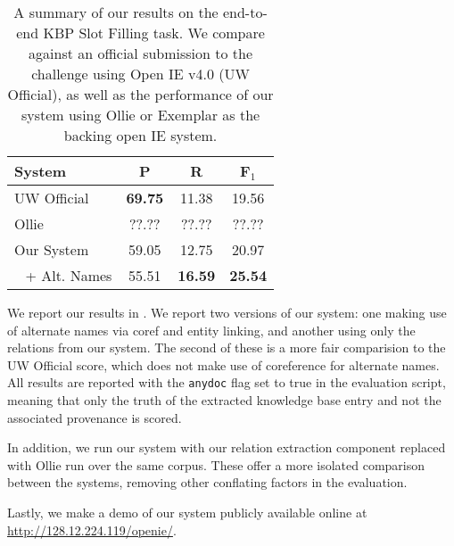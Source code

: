 \begin{table}
\begin{center}
\begin{tabular}{l|cc:c}
\textbf{System} & \textbf{P} & \textbf{R} & \textbf{F$_1$} \\
\hline
UW Official         & \textbf{69.75} & 11.38 & 19.56 \\
Ollie               & ??.?? & ??.?? & ??.?? \\
\hline
Our System          & 59.05 & 12.75 & 20.97 \\
$~~$ + Alt. Names & 55.51 & \textbf{16.59} & \textbf{25.54} \\
\end{tabular}
\end{center}
\caption{\label{tab:results}
A summary of our results on the end-to-end KBP Slot Filling task.
We compare against an official submission to the challenge using
  Open IE v4.0 (UW Official), as well as the performance of our system
  using Ollie or Exemplar as the backing open IE system.
}
\end{table}

We report our results in .
We report two versions of our system: one making use of alternate names
  via coref and entity linking, and another using only the relations from
  our system.
The second of these is a more fair comparision to the UW Official score,
  which does not make use of coreference for alternate names.
All results are reported with the \texttt{anydoc} flag set to true
  in the evaluation script, meaning that only the truth of the extracted
  knowledge base entry and not the associated provenance is scored.

In addition, we run our system with our relation extraction component replaced
  with Ollie \cite{key:2012mausam-ollie} run over the same corpus.
These offer a more isolated comparison between the systems, removing
  other conflating factors in the evaluation.

Lastly, we make a demo of our system publicly available online at
  \url{http://128.12.224.119/openie/}.
